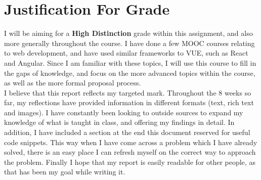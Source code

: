 \documentclass[portfolio.tex]{subfiles}
\begin{document}
	\chapter{Justification For Grade}
		I will be aiming for a \textbf{High Distinction} grade within this assignment, and also more generally throughout the course. I have done a few MOOC courses relating to web development, and have used similar frameworks to VUE, such as React and Angular. Since I am familiar with these topics, I will use this course to fill in the gaps of knowledge, and focus on the more advanced topics within the course, as well as the more formal proposal process. \\

		I believe that this report reflects my targeted mark. Throughout the 8 weeks so far, my reflections have provided information in different formats (text, rich text and images). I have constantly been looking to outside sources to expand my knowledge of what is taught in class, and offering my findings in detail. In addition, I have included a section at the end this document reserved for useful code snippets. This way when I have come across a problem which I have already solved, there is an easy place I can refresh myself on the correct way to approach the problem. Finally I hope that my report is easily readable for other people, as that has been my goal while writing it.\\
\end{document}
